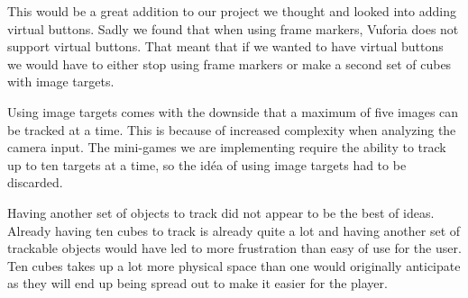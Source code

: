 This would be a great addition to our project we thought and looked into adding virtual buttons.
Sadly we found that when using frame markers, Vuforia does not support virtual buttons. That meant that if we wanted to have virtual buttons we would have to either stop using frame markers or make a second set of cubes with image targets.

Using image targets comes with the downside that a maximum of five images can be tracked at a time. This is because of increased complexity when analyzing the camera input. The mini-games we are implementing require the ability to track up to ten targets at a time, so the id\'ea of using image targets had to be discarded.

Having another set of objects to track did not appear to be the best of ideas. 
Already having ten cubes to track is already quite a lot and having another set of trackable objects would have led to more frustration than easy of use for the user.
Ten cubes takes up a lot more physical space than one would originally anticipate as they will end up being spread out to make it easier for the player.
